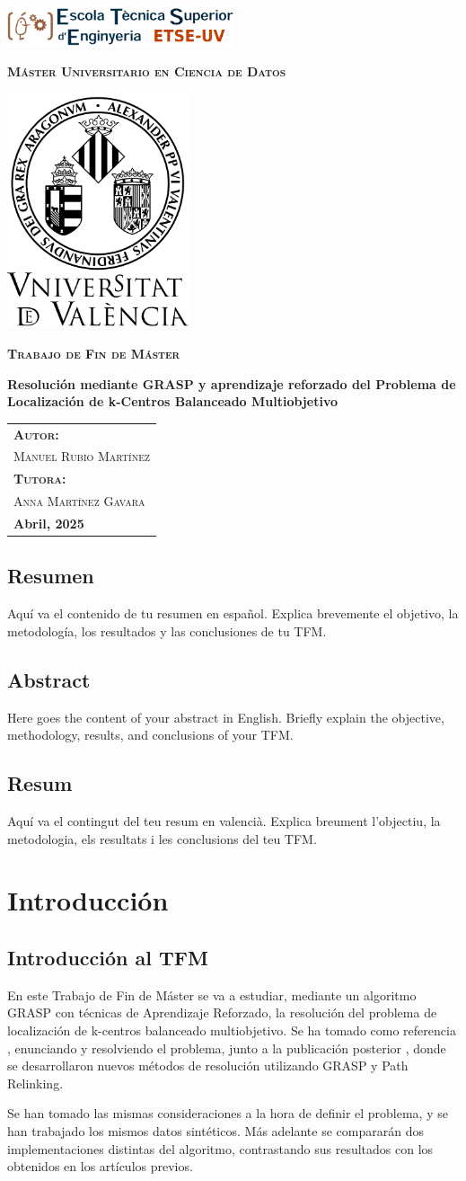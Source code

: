 \documentclass[12pt,a4paper]{book}
\newcommand{\nuevaportada}[6]{
    \thispagestyle{empty}
    \begin{center}
        \includegraphics[width=0.5\textwidth]{images/logo.png}
        
        \vspace{0.3cm} %
        {\Large\bfseries\textsc{M\'aster Universitario en #1}\par}
        
        \vspace{0.3cm} %
        \includegraphics[width=0.4\textwidth]{images/uv.png}
        
        \vspace{0.3cm} %
        {\Large\bfseries\textsc{Trabajo de Fin de M\'aster}\par}
        
        \vspace{0.5cm} %
        {\Large\bfseries #2\par}
        
        \vspace{1.5cm} %
        \begin{flushright}
            \begin{tabular}{l} 
                {\large\bfseries\textsc{Autor:}} \\
                {\large\textsc{#3}} \\ [0.3cm] %
                {\large\bfseries\textsc{Tutora:}} \\ 
                {\large\textsc{#4}} \\ [0.3cm] %
                {\large\bfseries #5} 
            \end{tabular}
        \end{flushright}
    \end{center}
}
\begin{document}
\nuevaportada{Ciencia de Datos}{Resolución mediante GRASP y aprendizaje reforzado del Problema de Localización de k-Centros Balanceado Multiobjetivo}{Manuel Rubio Martínez}{Anna Martínez Gavara}{Abril, 2025}

\clearpage

\newpage
\tableofcontents

\newpage

\section*{Resumen}
Aquí va el contenido de tu resumen en español. Explica brevemente el objetivo, la metodología, los resultados y las conclusiones de tu TFM.

\newpage

\section*{Abstract}
Here goes the content of your abstract in English. Briefly explain the objective, methodology, results, and conclusions of your TFM.

\newpage

\section*{Resum}
Aquí va el contingut del teu resum en valencià. Explica breument l'objectiu, la metodologia, els resultats i les conclusions del teu TFM.

\newpage

\chapter{Introducción}

\section{Introducción al TFM}
En este Trabajo de Fin de Máster se va a estudiar, mediante un algoritmo GRASP con técnicas de Aprendizaje Reforzado, la resolución del problema de localización de k-centros balanceado multiobjetivo.
Se ha tomado como referencia \cite{k-balanced_1}, enunciando y resolviendo el problema, junto a la publicación posterior \cite{k-Balanced_2}, donde se desarrollaron nuevos métodos de resolución utilizando GRASP y Path Relinking.

Se han tomado las mismas consideraciones a la hora de definir el problema, y se han trabajado los mismos datos sintéticos.
Más adelante se compararán dos implementaciones distintas del algoritmo, contrastando sus resultados con los obtenidos en los artículos previos.
\end{document}
